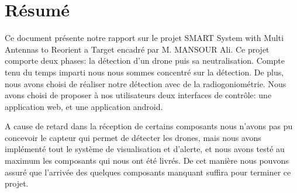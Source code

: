 
\chapter*{Résumé}




Ce document présente notre rapport sur le projet SMART \og System with Multi Antennas to Reorient a Target\fg{} encadré  par M. MANSOUR Ali. Ce projet comporte deux phases: la détection d'un drone puis sa neutralisation. Compte tenu du  temps imparti nous nous sommes concentré sur la détection. De plus, nous avons choisi de réaliser notre détection avec de la radiogoniométrie. Nous avons choisi de proposer à nos utilisateurs deux interfaces de contrôle: une application web, et une application android.


A cause de retard dans la réception de certains composants nous n'avons pas pu concevoir le capteur qui permet de détecter les drones, mais nous avons implémenté tout le système de visualisation et d'alerte, et nous avons testé au maximum les composants qui nous ont été livrés. De cet manière nous pouvons assuré que l'arrivée des quelques composants manquant suffira pour terminer ce projet. ~\\






